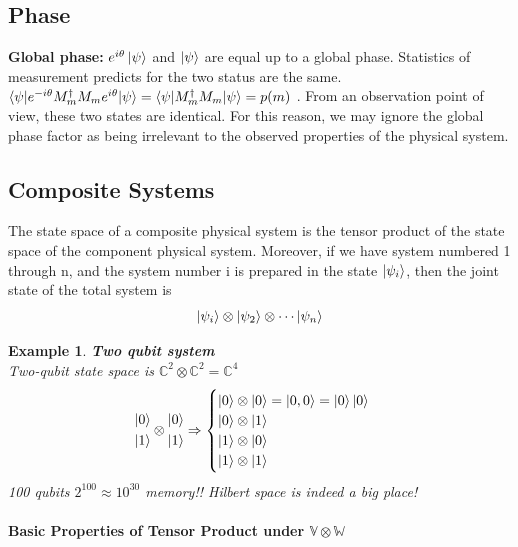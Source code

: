 \documentclass[]{book}
\newtheorem*{example}{Example}
\theoremstyle{nonumberplain}
\begin{document}
\subsection{Phase}
\label{subsubsec:phase}
\textbf{Global phase: } $e^{i\theta}\ket{\psi}$ and $\ket{\psi}$ are equal up to a global phase. Statistics of measurement predicts for the two status are the same. $\braket{\psi|e^{-i\theta}M^{\dagger}_{m}M_{m}e^{i\theta}|\psi} = \braket{\psi|M^{\dagger}_{m}M_{m}|\psi}=p(m)$ . From an observation point of view, these two states are identical. For this reason, we may ignore the global phase factor as being irrelevant to the observed properties of the physical system.
\subsection{Composite Systems}
\begin{postu}[4]
The state space of a composite physical system is the tensor product of the state space of the component physical system. Moreover, if we have system numbered 1 through n, and the system number i is prepared in the state $\ket{\psi_{i}}$, then the joint state of the total system is
\[
	\ket{\psi_{i}}\otimes\ket{\psi_{2}}\otimes\cdots\ket{\psi_{n}}
\] 
\end{postu}
\begin{example}
\textbf{Two qubit system} \\
Two-qubit state space is $\mathbb{C}^{2}\otimes\mathbb{C}^{2}=\mathbb{C}^{4}$
\begin{equation*}
\begin{aligned}
\ket{0} \\
\ket{1}
\end{aligned}
\otimes
\begin{aligned}
\ket{0} \\
\ket{1}
\end{aligned}
\Rightarrow
\begin{cases}
\ket{0} \otimes \ket{0}  = \ket{0,0} = \ket{0}\ket{0}\\
\ket{0} \otimes \ket{1} \\
\ket{1} \otimes \ket{0} \\
\ket{1} \otimes \ket{1} \\
\end{cases}
\end{equation*}
100 qubits $2^{100}\approx 10^{30}$ memory!! Hilbert space is indeed a big place!
\end{example}
\paragraph{Basic Properties of Tensor Product under $\mathbb{V}\otimes\mathbb{W}$}%
\label{par:basic_properties_of_tensor_product_under_votimesw_}
\end{document}

